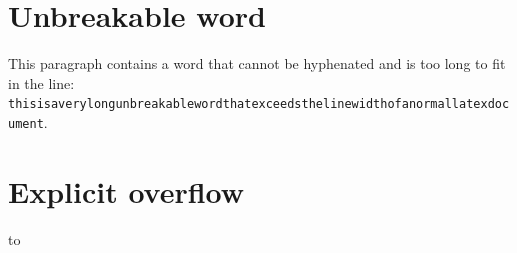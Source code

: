 \documentclass{article}
\begin{document}
\section{Unbreakable word}

This paragraph contains a word that cannot be hyphenated and is too long
to fit in the line: \texttt{thisisaverylongunbreakablewordthatexceedsthelinewidthofanormallatexdocument}.

\section{Explicit overflow}

\noindent\hbox to \linewidth{Left side \hfill Right side that is pushed much too far beyond the margin boundary.}
\end{document}
